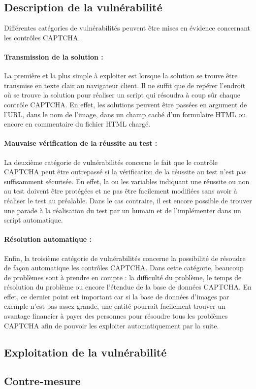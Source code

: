 \subsection{Description de la vulnérabilité}

Différentes catégories de vulnérabilités peuvent être mises en évidence concernant les contrôles CAPTCHA.

\paragraph{Transmission de la solution :}

La première et la plus simple à exploiter est lorsque la solution se trouve être transmise en texte clair au navigateur client. Il ne suffit que de repérer l'endroit où se trouve la solution pour réaliser un script qui résoudra à coup sûr chaque contrôle CAPTCHA. En effet, les solutions peuvent être passées en argument de l'URL, dans le nom de l'image, dans un champ caché d'un formulaire HTML ou encore en commentaire du fichier HTML chargé. 

\paragraph{Mauvaise vérification de la réussite au test :}

La deuxième catégorie de vulnérabilités concerne le fait que le contrôle CAPTCHA peut être outrepassé si la vérification de la réussite au test n'est pas suffisamment sécurisée. En effet, la ou les variables indiquant une réussite ou non au test doivent être protégées et ne pas être facilement modifiées sans avoir à réaliser le test au préalable. Dans le cas contraire, il est encore possible de trouver une parade à la réalisation du test par un humain et de l'implémenter dans un script automatique.

\paragraph{Résolution automatique :}

Enfin, la troisième catégorie de vulnérabilités concerne la possibilité de résoudre de façon automatique les contrôles CAPTCHA. Dans cette catégorie, beaucoup de problèmes sont à prendre en compte : la difficulté du problème, le temps de résolution du problème ou encore l'étendue de la base de données CAPTCHA. En effet, ce dernier point est important car si la base de données d'images par exemple n'est pas assez grande, une entité pourrait facilement trouver un avantage financier à payer des personnes pour résoudre tous les problèmes CAPTCHA afin de pouvoir les exploiter automatiquement par la suite.

\subsection{Exploitation de la vulnérabilité}

\subsection{Contre-mesure}








